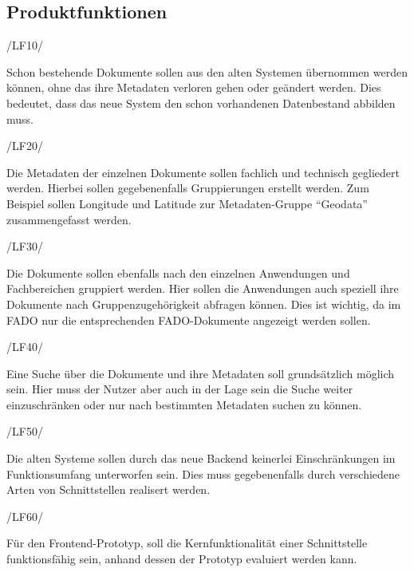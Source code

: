 \subsection{Produktfunktionen} \label{Produktfunktionen}
\begin{minipage}{3cm}
/LF10/
\end{minipage}
\begin{minipage}{13cm}
Schon bestehende Dokumente sollen aus den alten Systemen \"ubernommen werden k\"onnen, ohne das ihre Metadaten verloren gehen oder ge\"andert werden. Dies bedeutet, dass das neue System den schon vorhandenen Datenbestand abbilden muss.\\
\end{minipage}
\begin{minipage}{3cm}
/LF20/
\end{minipage}
\begin{minipage}{13cm}
Die Metadaten der einzelnen Dokumente sollen fachlich und technisch gegliedert werden. Hierbei sollen gegebenenfalls Gruppierungen erstellt werden. Zum Beispiel sollen Longitude und Latitude zur Metadaten-Gruppe "`Geodata"' zusammengefasst werden.\\
\end{minipage}
\begin{minipage}{3cm}
/LF30/
\end{minipage}
\begin{minipage}{13cm}
Die Dokumente sollen ebenfalls nach den einzelnen Anwendungen und Fachbereichen gruppiert werden. Hier sollen die Anwendungen auch speziell ihre Dokumente nach Gruppenzugeh\"origkeit abfragen k\"onnen. Dies ist wichtig, da im \ac{FADO} nur die entsprechenden \ac{FADO}-Dokumente angezeigt werden sollen.\\
\end{minipage}
\begin{minipage}{3cm}
/LF40/
\end{minipage}
\begin{minipage}{13cm}
Eine Suche \"uber die Dokumente und ihre Metadaten soll grunds\"atzlich m\"oglich sein. Hier muss der Nutzer aber auch in der Lage sein die Suche weiter einzuschr\"anken oder nur nach bestimmten Metadaten suchen zu k\"onnen.\\
\end{minipage}
\begin{minipage}{3cm}
/LF50/
\end{minipage}
\begin{minipage}{13cm}
Die alten Systeme sollen durch das neue Backend keinerlei Einschr\"ankungen im Funktionsumfang unterworfen sein. Dies muss gegebenenfalls durch verschiedene Arten von Schnittstellen realisert werden.\\
\end{minipage}
\begin{minipage}{3cm}
/LF60/
\end{minipage}
\begin{minipage}{13cm}
F\"ur den Frontend-Prototyp, soll die Kernfunktionalit\"at einer Schnittstelle funktionsf\"ahig sein, anhand dessen der Prototyp evaluiert werden kann.\\
\end{minipage}

